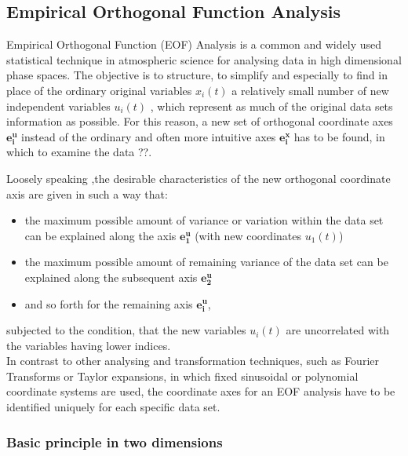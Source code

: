 
	
	\subsection{Empirical Orthogonal Function Analysis}
	\label{subsec:EOF}
	
Empirical Orthogonal Function (EOF) Analysis is a common and widely used statistical technique in atmospheric science for analysing data in high dimensional phase spaces.
The objective is to structure, to simplify  and especially to find in place of the ordinary original variables $x_i(t)$ a relatively small number of new independent variables $u_i(t)$  , which represent as much of the original data sets information as possible. For this reason, a new set of orthogonal coordinate axes $\bm{e_{i}^u}$ instead of the ordinary and often more intuitive axes $\bm{e_{i}^x}$ has to be found, in which to examine the data \cite{Wilks2006}??. 


Loosely speaking ,the desirable characteristics of the new orthogonal coordinate axis are given in such a way that:
\begin{itemize}
	\item the maximum possible amount of variance or variation within the data set can be explained along the 	axis $\bm{e_{1}^u}$ (with new coordinates $u_1(t)$)
	\item the maximum possible amount of remaining variance of the data set can be explained along the subsequent axis $\bm{e_{2}^u}$  
	\item and so forth for the remaining axis $\bm{e_{i}^u}$,
\end{itemize}
subjected to the condition, that the new variables $u_i(t)$ are uncorrelated with the variables having lower indices.\\
In contrast to other analysing and transformation techniques, such as Fourier Transforms or Taylor expansions, in which fixed sinusoidal or polynomial coordinate systems are used, the coordinate axes for an EOF analysis have to be identified uniquely for each specific data set.


		\subsubsection{Basic principle in two dimensions}
		\label{subsubsec:2d-case}
		
